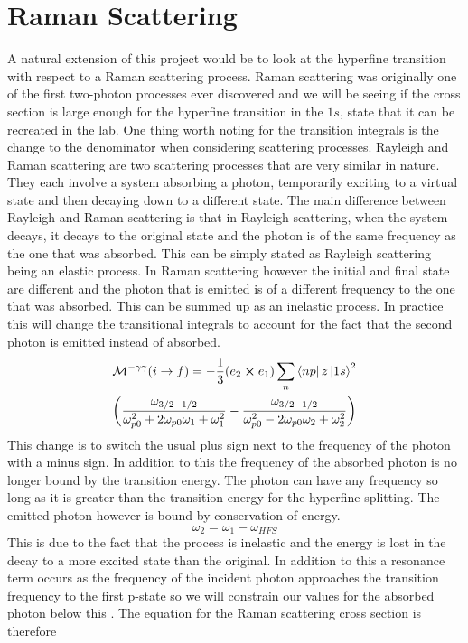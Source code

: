 \section{Raman Scattering}
A natural extension of this project would be to look at the hyperfine transition with respect to a Raman scattering process. Raman scattering was originally one of the first two-photon processes ever discovered and we will be seeing if the cross section is large enough for the hyperfine transition in the $1s$, state that it can be recreated in the lab. One thing worth noting for the transition integrals is the change to the denominator when considering scattering processes. Rayleigh and Raman scattering are two scattering processes that are very similar in nature. They each involve a system absorbing a photon, temporarily exciting to a virtual state and then decaying down to a different state. The main difference between Rayleigh and Raman scattering is that in Rayleigh scattering, when the system decays, it decays to the original state and the photon is of the same frequency as the one that was absorbed. This can be simply stated as Rayleigh scattering being an elastic process. In Raman scattering however the initial and final state are different and the photon that is emitted is of a different frequency to the one that was absorbed. This can be summed up as an inelastic process. In practice this will change the transitional integrals to account for the fact that the second photon is emitted instead of absorbed.
\begin{equation}
\begin{split}
\mathcal{M}^{-\gamma\gamma}(i\rightarrow f)=
    -\frac{1}{3}(e_2\cross e_1)
    \sum_{n}\bra{np}z\ket{1s}^2\\
    \bigg(
    \frac{\omega_{3/2-1/2}}{\omega_{p0}^2+2\omega_{p0}\omega_1+\omega_1^2}
    -\frac{\omega_{3/2-1/2}}{\omega_{p0}^2-2\omega_{p0}\omega_2+\omega_2^2}
    \bigg)
    \end{split}
\end{equation}
This change is to switch the usual plus sign next to the frequency of the photon with a minus sign. In addition to this the frequency of the absorbed photon is no longer bound by the transition energy. The photon can have any frequency so long as it is greater than the transition energy for the hyperfine splitting. The emitted photon however is bound by conservation of energy.
\begin{equation}
    \omega_2=\omega_1-\omega_{HFS}
\end{equation}
This is due to the fact that the process is inelastic and the energy is lost in the decay to a more excited state than the original. In addition to this a resonance term occurs as the frequency of the incident photon approaches the transition frequency to the first p-state so we will constrain our values for the absorbed photon below this \cite{4667}. The equation for the Raman scattering cross section is therefore \cite{dalgarnoraman}
